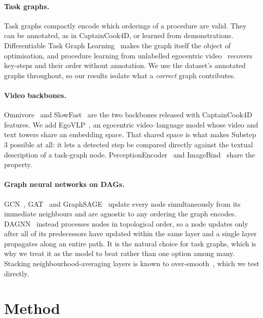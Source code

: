 \documentclass[10pt,twocolumn,letterpaper]{article}
\begin{document}
\paragraph{Task graphs.}
Task graphs compactly encode which orderings of a procedure are valid. They can be
annotated, as in CaptainCook4D, or learned from demonstrations. Differentiable
Task Graph Learning~\cite{seminara2024taskgraph} makes the graph itself the object
of optimisation, and procedure learning from unlabelled egocentric
video~\cite{bansal2022myview, chowdhury2024opel} recovers key-steps and their
order without annotation. We use the dataset's annotated graphs throughout, so our
results isolate what a \emph{correct} graph contributes.

\paragraph{Video backbones.}
Omnivore~\cite{girdhar2022omnivore} and SlowFast~\cite{feichtenhofer2019slowfast}
are the two backbones released with CaptainCook4D features. We add
EgoVLP~\cite{lin2022egovlp}, an egocentric video--language model whose video and
text towers share an embedding space. That shared space is what makes Substep 3
possible at all: it lets a detected step be compared directly against the textual
description of a task-graph node. PerceptionEncoder~\cite{bolya2025perception} and
ImageBind~\cite{girdhar2023imagebind} share the property.

\paragraph{Graph neural networks on DAGs.}
GCN~\cite{kipf2017gcn}, GAT~\cite{velickovic2018gat} and
GraphSAGE~\cite{hamilton2017graphsage} update every node simultaneously from its
immediate neighbours and are agnostic to any ordering the graph encodes. DAGNN~\cite{thost2021dagnn}
instead processes nodes in topological order, so a node updates only after all of
its predecessors have updated within the same layer and a single layer propagates
along an entire path. It is the natural choice for task graphs, which is why we
treat it as the model to beat rather than one option among many. Stacking
neighbourhood-averaging layers is known to over-smooth~\cite{li2018deeper}, which
we test directly.

\section{Method}
\end{document}
